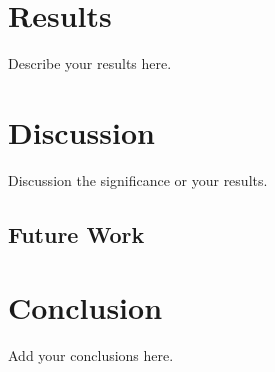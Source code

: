\documentclass[PhD]{PHlab-thesis}
\begin{document}
	
\chapter{Results}
Describe your results here.


\chapter{Discussion}
Discussion the significance or your results.


\section{Future Work}


\chapter{Conclusion}
Add your conclusions here.


\newpage
{}
\printbibliography
\end{document}

